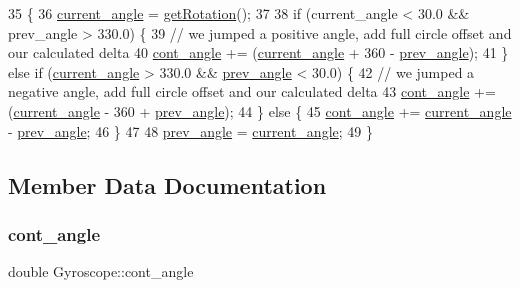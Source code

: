 \begin{DoxyCode}
35                                                \{
36     \hyperlink{class_gyroscope_a6da1957aa183ed0f0aabc6cd1ad85bf1}{current\_angle} = \hyperlink{class_gyroscope_a3dc93cb932fd98ce7e129100680887d5}{getRotation}();
37 
38     \textcolor{keywordflow}{if} (current\_angle < 30.0 && prev\_angle > 330.0) \{
39         \textcolor{comment}{// we jumped a positive angle, add full circle offset and our calculated delta}
40         \hyperlink{class_gyroscope_a1ed017e1e0767f70dfda902b858e04bc}{cont\_angle} += (\hyperlink{class_gyroscope_a6da1957aa183ed0f0aabc6cd1ad85bf1}{current\_angle} + 360 - \hyperlink{class_gyroscope_a05294072cbb0e362975d3f0ad626b716}{prev\_angle});
41     \} \textcolor{keywordflow}{else} \textcolor{keywordflow}{if} (\hyperlink{class_gyroscope_a6da1957aa183ed0f0aabc6cd1ad85bf1}{current\_angle} > 330.0 && \hyperlink{class_gyroscope_a05294072cbb0e362975d3f0ad626b716}{prev\_angle} < 30.0) \{
42         \textcolor{comment}{// we jumped a negative angle, add full circle offset and our calculated delta}
43         \hyperlink{class_gyroscope_a1ed017e1e0767f70dfda902b858e04bc}{cont\_angle} += (\hyperlink{class_gyroscope_a6da1957aa183ed0f0aabc6cd1ad85bf1}{current\_angle} - 360 + \hyperlink{class_gyroscope_a05294072cbb0e362975d3f0ad626b716}{prev\_angle});
44     \} \textcolor{keywordflow}{else} \{
45         \hyperlink{class_gyroscope_a1ed017e1e0767f70dfda902b858e04bc}{cont\_angle} += \hyperlink{class_gyroscope_a6da1957aa183ed0f0aabc6cd1ad85bf1}{current\_angle} - \hyperlink{class_gyroscope_a05294072cbb0e362975d3f0ad626b716}{prev\_angle};
46     \}
47 
48     \hyperlink{class_gyroscope_a05294072cbb0e362975d3f0ad626b716}{prev\_angle} = \hyperlink{class_gyroscope_a6da1957aa183ed0f0aabc6cd1ad85bf1}{current\_angle};
49 \}
\end{DoxyCode}


\subsection{Member Data Documentation}
\mbox{\label{class_gyroscope_a1ed017e1e0767f70dfda902b858e04bc}} 
\subsubsection{\texorpdfstring{cont\+\_\+angle}{cont\_angle}}
{\footnotesize\ttfamily double Gyroscope\+::cont\+\_\+angle\hspace{0.3cm}{\ttfamily [private]}}



